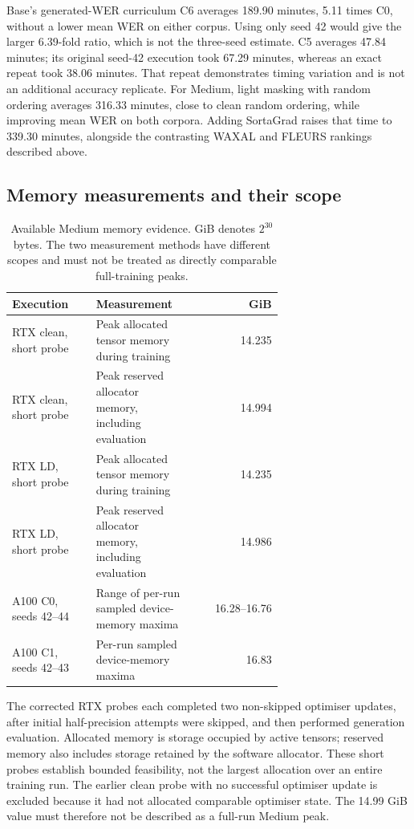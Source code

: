 \documentclass[12pt,a4paper]{report}
\begin{document}
Base's generated-WER curriculum C6 averages 189.90 minutes, 5.11 times
C0, without a lower mean WER on either corpus. Using only seed 42 would
give the larger 6.39-fold ratio, which is not the three-seed estimate.
C5 averages 47.84 minutes; its original seed-42 execution took 67.29 minutes,
whereas an exact repeat took 38.06 minutes. That repeat demonstrates timing
variation and is not an additional accuracy replicate. For Medium, light
masking with random ordering averages 316.33 minutes, close to clean random
ordering, while improving mean WER on both corpora. Adding SortaGrad raises
that time to 339.30 minutes, alongside the contrasting WAXAL and FLEURS
rankings described above.

\subsection{Memory measurements and their scope}

\begin{table}[htbp]\centering\small
\caption{Available Medium memory evidence. GiB denotes $2^{30}$ bytes.
The two measurement methods have different scopes and must not be treated
as directly comparable full-training peaks.}
\label{tab:memory}
\begin{tabular}{p{0.31\linewidth}p{0.36\linewidth}r}\toprule
Execution & Measurement & GiB\\\midrule
RTX clean, short probe & Peak allocated tensor memory during training & 14.235\\
RTX clean, short probe & Peak reserved allocator memory, including evaluation & 14.994\\
RTX LD, short probe & Peak allocated tensor memory during training & 14.235\\
RTX LD, short probe & Peak reserved allocator memory, including evaluation & 14.986\\
A100 C0, seeds 42--44 & Range of per-run sampled device-memory maxima & 16.28--16.76\\
A100 C1, seeds 42--43 & Per-run sampled device-memory maxima & 16.83\\
\bottomrule\end{tabular}\end{table}

The corrected RTX probes each completed two non-skipped optimiser updates,
after initial half-precision attempts were skipped, and then performed
generation evaluation. Allocated memory is storage occupied by active tensors;
reserved memory also includes storage retained by the software allocator.
These short probes establish bounded feasibility, not the largest allocation
over an entire training run. The earlier clean probe with no successful
optimiser update is excluded because it had not allocated comparable optimiser
state. The 14.99 GiB value must therefore not be described as a full-run
Medium peak.
\end{document}
